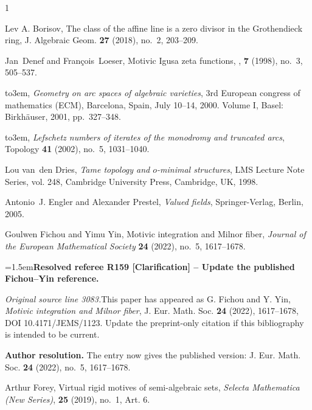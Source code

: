 \documentclass[12pt]{amsart}
\newcommand{\ResolvedRefereeRemark}[5]{%
  \par\medskip\begingroup\normalfont\small\color{gray}%
  \emergencystretch=1.5em\noindent\textbf{Resolved referee R#1 [#2] -- #3.}\par\nobreak\noindent #4\par
  \medskip\color{ResolutionGreen}\noindent\textbf{Author resolution.} #5\par
  \endgroup\medskip
}
\theoremstyle{plain}
\theoremstyle{definition}
\theoremstyle{remark}
\numberwithin{equation}{section}
\theoremstyle{plain}
\newcommand{\omin}{$o$\nobreakdash}
\newcommand{\0}{\emptyset}
\begin{document}
\providecommand{\bysame}{\leavevmode\hbox to3em{\hrulefill}\thinspace}
\providecommand{\MR}{\relax\ifhmode\unskip\space\fi MR }
\providecommand{\MRhref}[2]{%
  \href{http://www.ams.org/mathscinet-getitem?mr=#1}{#2}
}
\providecommand{\href}[2]{#2}
\begin{thebibliography}{1}

Lev A. Borisov, {The class of the affine line is a zero divisor in the
  {G}rothendieck ring}, J. Algebraic Geom. \textbf{27} (2018), no.~2, 203--209.

Jan~Denef and Fran\c cois~Loeser,
\newblock Motivic {{Igusa}} zeta functions,
, \textbf{7} (1998), no.~3, 505--537.

\bysame, \emph{{Geometry on arc spaces of algebraic varieties}}, {3rd European
  congress of mathematics (ECM), Barcelona, Spain, July 10--14, 2000. Volume
  I}, Basel: Birkh\"auser, 2001, pp.~327--348.

\bysame, \emph{Lefschetz numbers of iterates of the monodromy and truncated
  arcs}, Topology \textbf{41} (2002), no.~5, 1031--1040.

Lou van~den Dries, \emph{Tame topology and \omin-minimal structures}, LMS Lecture Note
  Series, vol. 248, Cambridge University Press, Cambridge, UK, 1998.

Antonio~J. Engler and Alexander Prestel, \emph{Valued fields}, Springer-Verlag,
  Berlin, 2005.

Goulwen Fichou and Yimu Yin, {Motivic integration and Milnor fiber}, {\em Journal of the European Mathematical Society} \textbf{24} (2022), no.~5, 1617--1678.

\ResolvedRefereeRemark{159}{Clarification}{Update the published Fichou--Yin reference}{%
\textit{Original source line 3083.}\quad This paper has appeared as G. Fichou and Y. Yin, \emph{Motivic integration and Milnor fiber}, J. Eur. Math. Soc. \textbf{24} (2022), 1617--1678, DOI \href{https://doi.org/10.4171/JEMS/1123}{10.4171/JEMS/1123}. Update the preprint-only citation if this bibliography is intended to be current.
}{The entry now gives the published version: J. Eur. Math. Soc. \textbf{24} (2022), no.~5, 1617--1678.}


Arthur Forey, {Virtual rigid motives of semi-algebraic sets}, {\em Selecta Mathematica (New Series)}, \textbf{25} (2019),  no.~1, Art. 6.



\end{thebibliography}
\end{document}
